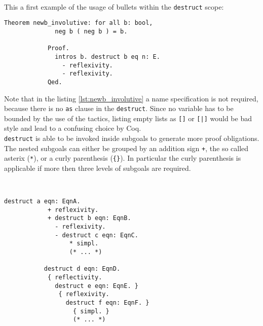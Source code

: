 		\begin{example}  
		~\\\vspace{-5mm} 
		This a first example of the usage of bullets within the \lstinline!destruct! scope:
		{\normalfont
		  \begin{lstlisting}[caption=\lstinline!newb_involutive!, label=lst:newb_involutive]
		  	Theorem newb_involutive: for all b: bool,
		  	  neg b ( neg b ) = b.
		  	  
		  	Proof. 
		  	  intros b. destruct b eq n: E.
		  	    - reflexivity. 
		  	    - reflexivity. 
		  	Qed.  	   
		  \end{lstlisting}}
		\end{example}	 
		 Note that in the listing \ref{lst:newb_involutive} a name specification is not required, because there is no \lstinline!as! clause in the \lstinline!destruct!.
		 Since no variable has to be bounded by the use of the tactics, listing empty lists as \lstinline![]! or \lstinline![|]! would be bad style and lead to a confusing choice by Coq.\\	 
		 \lstinline!destruct! is able to be invoked inside subgoals to generate more proof obligations.
		  The nested subgoals can either be grouped by an addition sign \lstinline!+!, the so called asterix (\lstinline!*!), or a curly parenthesis (\lstinline!{}!). 
		  In particular the curly parenthesis is applicable if more then three levels of subgoals are required. 
		  \begin{example}%
		   ~\\\vspace{-10mm}
		  {\normalfont 
		  \begin{lstlisting}[caption = syntax of nested \lstinline!destruct! expressions]
		  destruct a eqn: EqnA.
		    + reflexivity.
		    + destruct b eqn: EqnB.
		      - reflexivity.
		      - destruct c eqn: EqnC.
		          * simpl. 
		          (* ... *)       
		  
		   destruct d eqn: EqnD.
		    { reflectivity.
		      destruct e eqn: EqnE. } 
		       { reflexivity.
		         destruct f eqn: EqnF. } 
		           { simpl. }
		           (* ... *)   
		   \end{lstlisting}}
		   \end{example}
		   	 
